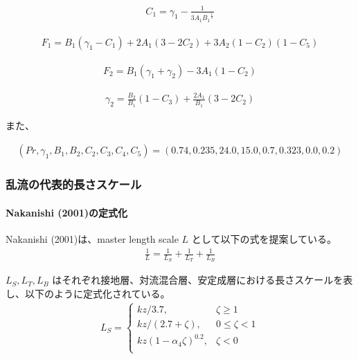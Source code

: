 \begin{eqnarray}C_1=\gamma_1-\frac{1}{3A_1{B_1}^{\frac{1}{3}}}\end{eqnarray}

\begin{eqnarray}F_1=B_1(\gamma_1-C_1)+2A_1(3-2C_2)+3A_2(1-C_2)(1-C_5)\end{eqnarray}

\begin{eqnarray}F_2=B_1(\gamma_1+\gamma_2)-3A_1(1-C_2)\end{eqnarray}

\begin{eqnarray}\gamma_2=\frac{B_2}{B_1}\left(1-C_3\right)+\frac{2A_1}{B_1}\left(3-2C_2\right)\end{eqnarray}

また、

\begin{eqnarray}
(Pr,\gamma_1,B_1,B_2,C_2,C_3,C_4,C_5)=(0.74,0.235,24.0,15.0,0.7,0.323,0.0,0.2)
\end{eqnarray}

\hypertarget{ux4e71ux6d41ux306eux4ee3ux8868ux7684ux9577ux3055ux30b9ux30b1ux30fcux30eb}{%
\subsubsection{乱流の代表的長さスケール}\label{ux4e71ux6d41ux306eux4ee3ux8868ux7684ux9577ux3055ux30b9ux30b1ux30fcux30eb}}

\hypertarget{nakanishi-2001ux306eux5b9aux5f0fux5316}{%
\paragraph{Nakanishi
(2001)の定式化}\label{nakanishi-2001ux306eux5b9aux5f0fux5316}}

Nakanishi (2001)は、master length scale \(L\)
として以下の式を提案している。
\begin{eqnarray}\frac{1}{L}=\frac{1}{L_S}+\frac{1}{L_T}+\frac{1}{L_B} \label{1} \end{eqnarray}

\(L_S,L_T,L_B\)
はそれぞれ接地層、対流混合層、安定成層における長さスケールを表し、以下のように定式化されている。
\begin{eqnarray}
L_S=\left\{
    \begin{array}{lr}
      kz/3.7, &\zeta\ge 1\\
      kz/(2.7+\zeta), &0\le\zeta< 1\\
      kz(1-\alpha_4\zeta)^{0.2}, &\zeta< 0\\
    \end{array}
  \right.
\end{eqnarray}

